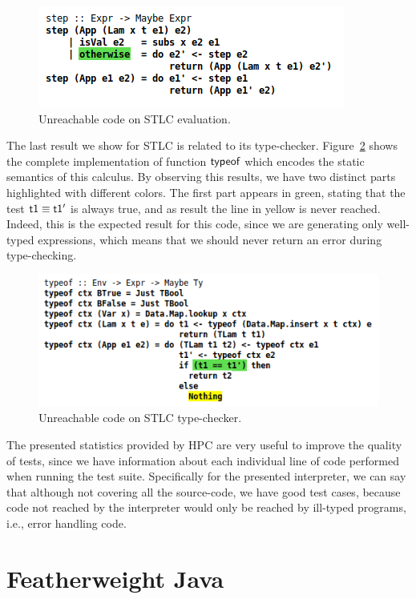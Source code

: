 \documentclass[tese,capa,english]{texufpel}
\newcommand{\D}[1]{\blue{\mathsf{#1}}}
\newcommand{\V}[1]{\black{\mathsf{#1}}}
\newcommand{\HFun}[1]{\blue{\mathsf{#1}}}
\begin{document}
\begin{figure}[!htb]
\centering
\includegraphics[width=0.57\linewidth]{Images/step_stlc}
\caption{Unreachable code on STLC evaluation.}
\label{fig:step-stlc}
\end{figure}

The last result we show for STLC is related to its type-checker. Figure~\ref{fig:typeof-stlc} shows the complete implementation of function \ensuremath{\HFun{typeof}} which encodes the static semantics of this calculus. By observing this results, we have two distinct parts highlighted with different colors. The first part appears in green, stating that the test \ensuremath{\V{t1}\;\D{\equiv}\;\V{t1'}} is always true, and as result the line in yellow is never reached. Indeed, this is the expected result for this code, since we are generating only well-typed expressions, which means that we should never return an error during type-checking. 

\begin{figure}[!htb]
\centering
\includegraphics[width=0.75\linewidth]{Images/typeof_stlc}
\caption{Unreachable code on STLC type-checker.}
\label{fig:typeof-stlc}
\end{figure}

The presented statistics provided by HPC are very useful to improve the quality of tests, since we have information about each individual line of code performed when running the test suite. Specifically for the presented interpreter, we can say that although not covering all the source-code, we have good test cases, because code not reached by the interpreter would only be reached by ill-typed programs, i.e., error handling code.

\section{Featherweight Java}
\label{sec:pbt-fj}
\end{document}
